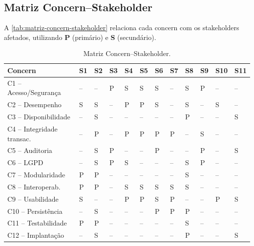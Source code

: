 \subsection{Matriz Concern--Stakeholder}
 
A \autoref{tab:matriz-concern-stakeholder} relaciona cada concern com os stakeholders
afetados, utilizando \textbf{P} (primário) e \textbf{S} (secundário).
 
\begin{table}[H]
\caption{Matriz Concern--Stakeholder.}
\label{tab:matriz-concern-stakeholder}
\centering
\footnotesize
\setlength{\tabcolsep}{4pt}
\begin{tabularx}{\textwidth}{|X|*{11}{>{\centering\arraybackslash}p{0.85cm}|}}
\hline
\textbf{Concern}
  & \textbf{S1} & \textbf{S2} & \textbf{S3} & \textbf{S4}
  & \textbf{S5} & \textbf{S6} & \textbf{S7} & \textbf{S8}
  & \textbf{S9} & \textbf{S10} & \textbf{S11} \\
\hline
C1 -- Acesso/Segurança     & -- & -- & P  & S  & S  & S  & --  & S  & P  & --  & -- \\
C2 -- Desempenho           & S  & S  & -- & P  & P  & S  & --  & S  & -- & S   & -- \\
C3 -- Disponibilidade      & -- & S  & -- & -- & -- & -- & --  & P  & -- & --  & S  \\
C4 -- Integridade transac. & -- & P  & -- & P  & P  & P  & P   & -- & S  & --  & -- \\
C5 -- Auditoria            & -- & S  & P  & -- & -- & P  & --  & -- & P  & --  & S  \\
C6 -- LGPD                 & -- & S  & P  & S  & -- & -- & --  & S  & P  & --  & -- \\
C7 -- Modularidade         & P  & P  & -- & -- & -- & -- & --  & S  & -- & --  & -- \\
C8 -- Interoperab.         & P  & P  & -- & S  & S  & S  & S   & S  & -- & --  & -- \\
C9 -- Usabilidade          & S  & -- & -- & P  & P  & S  & P   & -- & -- & P   & S  \\
C10 -- Persistência        & -- & S  & -- & -- & -- & P  & P   & P  & -- & --  & -- \\
C11 -- Testabilidade       & P  & P  & -- & -- & -- & -- & --  & S  & -- & --  & -- \\
C12 -- Implantação         & -- & S  & -- & -- & -- & -- & --  & P  & -- & --  & S  \\
\hline
\end{tabularx}
\end{table}














